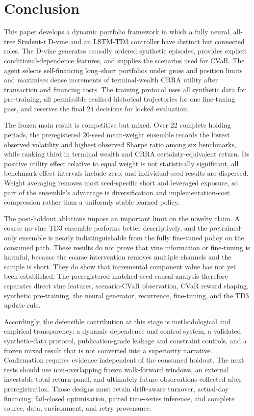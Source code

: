 \section{Conclusion}
\label{sec:conclusion}

This paper develops a dynamic portfolio framework in which a fully neural, all-tree Student-$t$ D-vine and an LSTM-TD3 controller have distinct but connected roles. The D-vine generates causally ordered synthetic episodes, provides explicit conditional-dependence features, and supplies the scenarios used for CVaR. The agent selects self-financing long--short portfolios under gross and position limits and maximises dense increments of terminal-wealth CRRA utility after transaction and financing costs. The training protocol uses all synthetic data for pre-training, all permissible realised historical trajectories for one fine-tuning pass, and reserves the final 24 decisions for locked evaluation.

The frozen main result is competitive but mixed. Over 22 complete holding periods, the preregistered 20-seed mean-weight ensemble records the lowest observed volatility and highest observed Sharpe ratio among six benchmarks, while ranking third in terminal wealth and CRRA certainty-equivalent return. Its positive utility effect relative to equal weight is not statistically significant, all benchmark-effect intervals include zero, and individual-seed results are dispersed. Weight averaging removes most seed-specific short and leveraged exposure, so part of the ensemble's advantage is diversification and implementation-cost compression rather than a uniformly stable learned policy.

The post-holdout ablations impose an important limit on the novelty claim. A coarse no-vine TD3 ensemble performs better descriptively, and the pretrained-only ensemble is nearly indistinguishable from the fully fine-tuned policy on the consumed path. These results do not prove that vine information or fine-tuning is harmful, because the coarse intervention removes multiple channels and the sample is short. They do show that incremental component value has not yet been established. The preregistered matched-seed causal analysis therefore separates direct vine features, scenario-CVaR observation, CVaR reward shaping, synthetic pre-training, the neural generator, recurrence, fine-tuning, and the TD3 update rule.

Accordingly, the defensible contribution at this stage is methodological and empirical transparency: a dynamic dependence and control system, a validated synthetic-data protocol, publication-grade leakage and constraint controls, and a frozen mixed result that is not converted into a superiority narrative. Confirmation requires evidence independent of the consumed holdout. The next tests should use non-overlapping frozen walk-forward windows, an external investable total-return panel, and ultimately future observations collected after preregistration. Those designs must retain drift-aware turnover, actual-day financing, fail-closed optimisation, paired time-series inference, and complete source, data, environment, and retry provenance.

